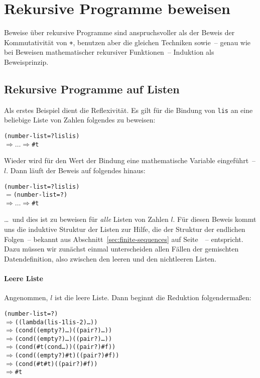 \section{Rekursive Programme beweisen}
\label{sec:rek-scheme-beweisen}

Beweise über rekursive Programme sind anspruchsvoller als der
Beweis der Kommutativität von \texttt{+}, benutzen aber die gleichen
Techniken sowie~-- genau wie bei Beweisen mathematischer rekursiver
Funktionen~-- Induktion als Beweisprinzip. 

\subsection{Rekursive Programme auf Listen}

Als erstes Beispiel dient
die Reflexivität.  Es gilt für die Bindung von \texttt{lis} an eine
beliebige Liste von Zahlen folgendes zu beweisen:
%
\begin{alltt}
(number-list=? lis lis)
\(\Longrightarrow\ldots\Longrightarrow\) \#t
\end{alltt}
%
Wieder wird für den Wert der Bindung eine mathematische Variable
eingeführt~-- $l$.  Dann läuft der Beweis auf folgendes hinaus:
%
\begin{alltt}
(number-list=? lis lis)
\(=\) (number-list=?  )
\(\Longrightarrow\ldots\Longrightarrow\) \#t
\end{alltt}
%
\ldots~und dies ist zu beweisen für \emph{alle} Listen von Zahlen $l$.
Für diesen Beweis kommt uns die induktive Struktur der Listen zur
Hilfe, die der Struktur der endlichen Folgen~-- bekannt aus
Abschnitt~\ref{sec:finite-sequences} auf
Seite~\pageref{sec:finite-sequences}~-- entspricht.  Dazu müssen wir
zunächst einmal unterscheiden allen Fällen der gemischten
Datendefinition, also zwischen den leeren und den nichtleeren Listen.

\paragraph{Leere Liste}
Angenommen, $l$ ist die leere Liste.  Dann beginnt die Reduktion
folgendermaßen:
%
\begin{alltt}
(number-list=?  )
\(\Longrightarrow\) ((lambda (lis-1 lis-2) \ldots{})  )
\(\Longrightarrow\) (cond ((empty? ) \ldots) ((pair? ) \ldots))
\(\Longrightarrow\) (cond ((empty? ) \ldots) ((pair? ) \ldots))
\(\Longrightarrow\) (cond (#t (cond \ldots)) ((pair? ) #f))
\(\Longrightarrow\) (cond ((empty? ) #t) ((pair? ) #f))
\(\Longrightarrow\) (cond (#t #t) ((pair? ) #f))
\(\Longrightarrow\) #t
\end{alltt}
%

